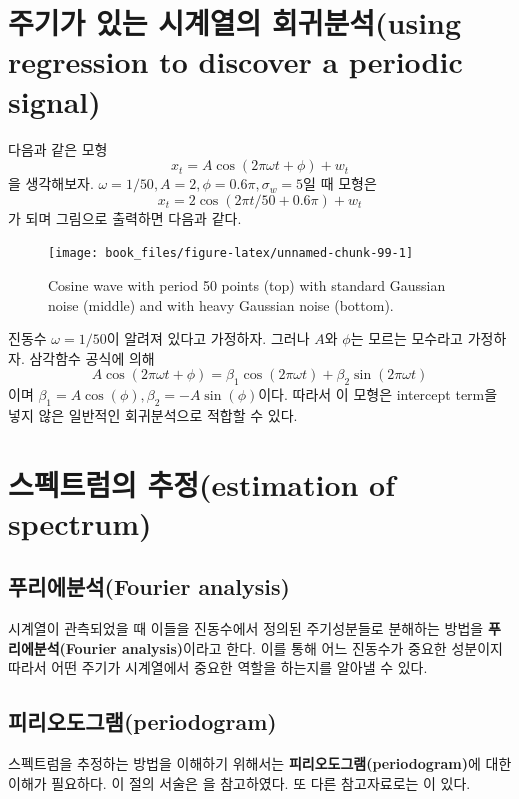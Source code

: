 \documentclass[b5paper,]{scrbook}
\theoremstyle{plain}
\theoremstyle{definition}
\numberwithin{equation}{section}
\begin{document}
\section{주기가 있는 시계열의 회귀분석(using regression to discover a
periodic
signal)}\label{---using-regression-to-discover-a-periodic-signal}

다음과 같은 모형 \[x_{t}=A\cos (2\pi\omega t + \phi) + w_{t}\] 을
생각해보자. \(\omega=1/50, A=2,\phi=0.6\pi, \sigma_{w}=5\)일 때 모형은
\[x_{t}=2\cos (2\pi t /50 + 0.6 \pi) + w_{t}\] 가 되며 그림으로 출력하면
다음과 같다.

\begin{figure}

{\centering \texttt{[image: book\_files/figure-latex/unnamed-chunk-99-1]} 

}

\caption{Cosine wave with period 50 points (top) with standard Gaussian noise (middle) and with heavy Gaussian noise (bottom).}\label{fig:unnamed-chunk-99}
\end{figure}

진동수 \(\omega=1/50\)이 알려져 있다고 가정하자. 그러나 \(A\)와
\(\phi\)는 모르는 모수라고 가정하자. 삼각함수 공식에 의해
\[A\cos (2\pi \omega t + \phi)=\beta_{1}\cos (2\pi \omega t) + \beta_{2}\sin (2\pi\omega t)\]
이며 \(\beta_{1}=A\cos(\phi), \beta_{2}=-A\sin(\phi)\)이다. 따라서 이
모형은 intercept term을 넣지 않은 일반적인 회귀분석으로 적합할 수 있다.

\section{스펙트럼의 추정(estimation of
spectrum)}\label{-estimation-of-spectrum}

\subsection{푸리에분석(Fourier analysis)}\label{fourier-analysis}

시계열이 관측되었을 때 이들을 진동수에서 정의된 주기성분들로 분해하는
방법을 \textbf{푸리에분석(Fourier analysis)}이라고 한다. 이를 통해 어느
진동수가 중요한 성분이지 따라서 어떤 주기가 시계열에서 중요한 역할을
하는지를 알아낼 수 있다.

\subsection{피리오도그램(periodogram)}\label{periodogram}

스펙트럼을 추정하는 방법을 이해하기 위해서는
\textbf{피리오도그램(periodogram)}에 대한 이해가 필요하다. 이 절의
서술은 \citep{Lim2013}을 참고하였다. 또 다른 참고자료로는
\citep{Shumway2010}이 있다.
\end{document}
